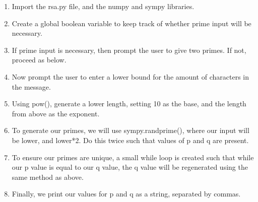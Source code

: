\documentclass{article}
\begin{document}
    \begin{enumerate}
        \item Import the rsa.py file, and the numpy and sympy libraries.

            \TextField[width=6in,height=1in, bordercolor=0 0 0, name=p3q1, multiline=true]{}

        \item Create a global boolean variable to keep track of whether prime input will be necessary.

            \TextField[width=6in,height=1in, bordercolor=0 0 0, name=p3q1, multiline=true]{}

        \item If prime input is necessary, then prompt the user to give two primes. If not,  proceed as below.

            \TextField[width=6in,height=1in, bordercolor=0 0 0, name=p3q1, multiline=true]{}

        \item Now prompt the user to enter a lower bound for the amount of characters in the message.

            \TextField[width=6in,height=1in, bordercolor=0 0 0, name=p3q1, multiline=true]{}

        \item Using pow(), generate a lower length, setting 10 as the base, and the length from above as the exponent.

            \TextField[width=6in,height=1in, bordercolor=0 0 0, name=p3q1, multiline=true]{}

        \item To generate our primes, we will use sympy.randprime(), where our input will be lower, and lower*2. Do this twice such that values of p and q are present.

            \TextField[width=6in,height=1in, bordercolor=0 0 0, name=p3q1, multiline=true]{}

        \item To ensure our primes are unique, a small while loop is created such that while our p value is equal to our q value, the q value will be regenerated using the same method as above.

            \TextField[width=6in,height=1in, bordercolor=0 0 0, name=p3q1, multiline=true]{}

        \item Finally, we print our values for p and q as a string, separated by commas.


\end{enumerate}
\end{document}
